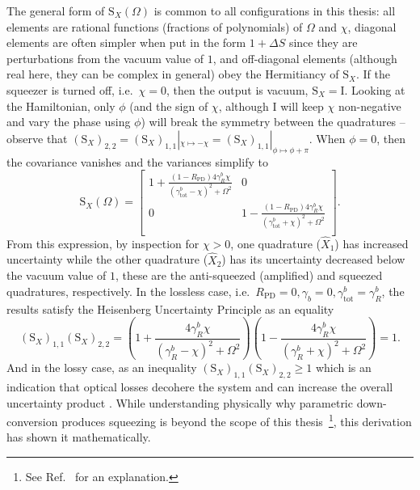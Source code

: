 The general form of $\text{S}_X(\Omega)$ is common to all configurations in this thesis: all elements are rational functions (fractions of polynomials) of $\Omega$ and $\chi$, diagonal elements are often simpler when put in the form $1 + \Delta S$ since they are perturbations from the vacuum value of $1$, and off-diagonal elements (although real here, they can be complex in general) obey the Hermitiancy of $\text{S}_X$. If the squeezer is turned off, i.e.\ $\chi=0$, then the output is vacuum, $\text{S}_X=\text{I}$. Looking at the Hamiltonian, only $\phi$ (and the sign of $\chi$, although I will keep $\chi$ non-negative and vary the phase using $\phi$) will break the symmetry between the quadratures  -- observe that $(\text{S}_X)_{2,2}=(\text{S}_X)_{1,1}|_{\chi\mapsto-\chi}=(\text{S}_X)_{1,1}|_{\phi\mapsto\phi+\pi}$. When $\phi=0$, then the covariance vanishes and the variances simplify to \begin{equation} \label{eq:dOPO_fixed_phase}
\text{S}_X(\Omega)=\left[
\begin{array}{cc}
 1+\frac{(1-R_\text{PD})4 \gamma^b_R \chi}{\left({\gamma^b_\text{tot}}-\chi\right)^2+\Omega ^2}
 & 0 \\
 0
 & 1-\frac{(1-R_\text{PD})4 \gamma^b_R \chi}{\left({\gamma^b_\text{tot}}+\chi\right)^2+\Omega ^2} \\
\end{array}
\right].\end{equation} From this expression, by inspection for $\chi>0$, one quadrature ($\hat X_1$) has increased uncertainty while the other quadrature ($\hat X_2$) has its uncertainty decreased below the vacuum value of $1$, these are the anti-squeezed (amplified) and squeezed quadratures, respectively. %
In the lossless case, i.e.\ $R_\text{PD}=0, \gamma_b=0, \gamma^b_\text{tot}=\gamma^b_R$, the results satisfy the Heisenberg Uncertainty Principle as an equality \begin{equation}\label{eq:dOPO_HUP_sat}(\text{S}_X)_{1,1}(\text{S}_X)_{2,2}=\left(1+\frac{4 \gamma^b_R \chi}{\left(\gamma^b_R-\chi\right)^2+\Omega ^2}\right)\left(1-\frac{4 \gamma^b_R \chi}{\left(\gamma^b_R+\chi\right)^2+\Omega ^2}\right)=1.\end{equation} And in the lossy case, as an inequality $(\text{S}_X)_{1,1}(\text{S}_X)_{2,2}\geq1$  which is an indication that optical losses decohere the system and can increase the overall uncertainty product . While understanding physically why parametric down-conversion produces squeezing is beyond the scope of this thesis~\footnote{See Ref.~\cite{} for an explanation.}, this derivation has shown it mathematically.

